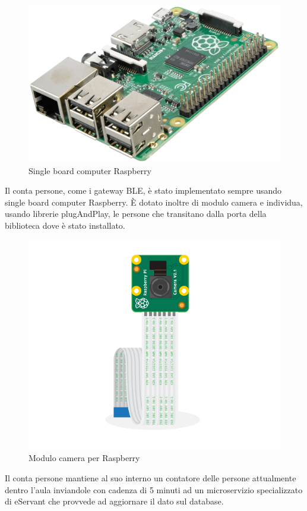 \begin{figure}[H]
    \centering  
    \caption{Single board computer Raspberry}
    \includegraphics[scale=0.2]{img/cap4/raspberry}
\end{figure}


Il conta persone, come i gateway BLE, è stato implementato sempre usando single board computer
Raspberry.
È dotato inoltre di modulo camera e individua, usando librerie plugAndPlay, le persone che transitano 
dalla porta della biblioteca dove è stato installato.

\begin{figure}[H]
    \centering  
    \caption{Modulo camera per Raspberry}
    \includegraphics[scale=0.2]{img/cap4/camera}
\end{figure}

Il conta persone mantiene al suo interno un contatore delle persone attualmente dentro l'aula
inviandole con cadenza di 5 minuti ad un microservizio specializzato di eServant che provvede ad
aggiornare il dato sul database.